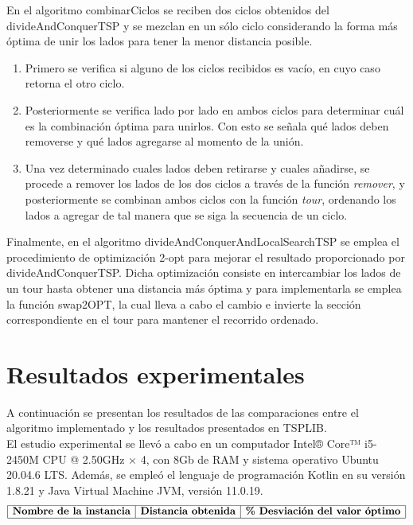 \documentclass[titlepage]{article}
\begin{document}
	En el algoritmo combinarCiclos se reciben dos ciclos obtenidos del divideAndConquerTSP y se mezclan en un s\'olo ciclo considerando la forma m\'as \'optima de unir los lados para tener la menor distancia posible. 
	
	\begin{enumerate}
		\item Primero se verifica si alguno de los ciclos recibidos es vac\'io, en cuyo caso retorna el otro ciclo.
		\item Posteriormente se verifica lado por lado en ambos ciclos para determinar cu\'al es la combinaci\'on \'optima para unirlos. Con esto se señala qu\'e lados deben removerse y qu\'e lados agregarse al momento de la uni\'on. 
		\item Una vez determinado cuales lados deben retirarse y cuales añadirse, se procede a remover los lados de los dos ciclos a trav\'es de la funci\'on \textit{remover}, y posteriormente se combinan ambos ciclos con la funci\'on \textit{tour}, ordenando los lados a agregar de tal manera que se siga la secuencia de un ciclo.
	\end{enumerate}
	
	Finalmente, en el algoritmo divideAndConquerAndLocalSearchTSP se emplea el procedimiento de optimizaci\'on 2-opt para mejorar el resultado proporcionado por divideAndConquerTSP. Dicha optimizaci\'on consiste en intercambiar los lados de un tour hasta obtener una distancia m\'as \'optima y para implementarla se emplea la funci\'on swap2OPT, la cual lleva a cabo el cambio e invierte la secci\'on correspondiente en el tour para mantener el recorrido ordenado. 
	
	\section{Resultados experimentales}
	
	A continuaci\'on se presentan los resultados de las comparaciones entre el algoritmo implementado y los resultados presentados en TSPLIB.\\
	
	El estudio experimental se llev\'o a cabo en un computador Intel® Core™ i5-2450M CPU @ 2.50GHz × 4, con 8Gb de RAM y sistema operativo Ubuntu 20.04.6 LTS. Adem\'as, se emple\'o el lenguaje de programaci\'on Kotlin en su versi\'on 1.8.21 y Java Virtual Machine JVM, versi\'on 11.0.19.\\
	
	$$\begin{array}{|c|c|c|}
		\hline
		\textbf{Nombre de la instancia} & \textbf{Distancia obtenida} & \textbf{\% Desviaci\'on del valor \'optimo}\\
		\hline
	\end{array}$$\:
	
\end{document}
